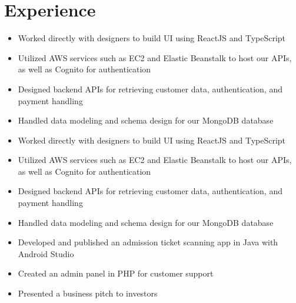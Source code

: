 \documentclass{cv}
\begin{document}
	\section{Experience}
	\begin{itemize}
		\item Worked directly with designers to build UI using ReactJS and TypeScript
		\item Utilized AWS services such as EC2 and Elastic Beanstalk to host our APIs, as well as Cognito for authentication
		\item Designed backend APIs for retrieving customer data, authentication, and payment handling
		\item Handled data modeling and schema design for our MongoDB database
	\end{itemize}

	\begin{itemize}
		\item Worked directly with designers to build UI using ReactJS and TypeScript
		\item Utilized AWS services such as EC2 and Elastic Beanstalk to host our APIs, as well as Cognito for authentication
		\item Designed backend APIs for retrieving customer data, authentication, and payment handling
		\item Handled data modeling and schema design for our MongoDB database
	\end{itemize}

	\begin{itemize}
		\item Developed and published an admission ticket scanning app in Java with Android Studio
		\item Created an admin panel in PHP for customer support 
		\item Presented a business pitch to investors
	\end{itemize}

	
\end{document}
